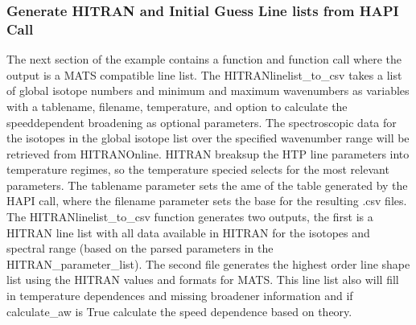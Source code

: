 \documentclass[letterpaper,10pt,english]{sphinxmanual}
\begin{document}
\begin{sphinxVerbatim}[commandchars=\\\{\}]
                                                  
                                            
                                       
\end{sphinxVerbatim}


\subsubsection{Generate HITRAN and Initial Guess Line lists from HAPI Call}
\label{\detokenize{Generating Parameter Line lists:generate-hitran-and-initial-guess-line-lists-from-hapi-call}}
\sphinxAtStartPar
The next section of the example contains a function and function call where the output is a MATS compatible line list.  The HITRANlinelist\_to\_csv takes a list of global isotope numbers and minimum and maximum wavenumbers as variables with a tablename, filename, temperature, and option to calculate the speed\sphinxhyphen{}dependent broadening as optional parameters.  The spectroscopic data for the isotopes in the global isotope list over the specified wavenumber range will be retrieved from HITRANOnline.  HITRAN breaks\sphinxhyphen{}up the HTP line parameters into temperature regimes, so the temperature specied selects for the most relevant parameters.  The tablename parameter sets the ame of the table generated by the HAPI call, where the filename parameter sets the base for the resulting .csv files.  The HITRANlinelist\_to\_csv function generates two outputs, the first is a HITRAN line list with all data available in HITRAN for the isotopes and spectral range (based on the parsed parameters in the HITRAN\_parameter\_list).  The second file generates the highest order line shape list using the HITRAN values and formats for MATS.  This line list also will fill in temperature dependences and missing broadener information and if calculate\_aw is True calculate the speed dependence based on theory.
\end{document}
